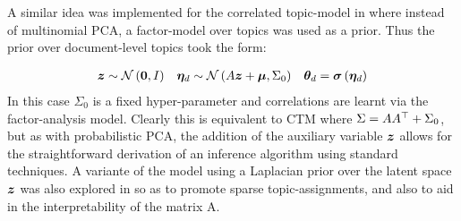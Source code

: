 A similar idea was implemented for the correlated topic-model in \cite{Putthividhya2009} where instead of multinomial PCA, a factor-model over topics was used as a prior. Thus the prior over document-level topics took the form:

\begin{align}
\bm z & \sim \mathcal{N} \left( {\bm 0}, {I} \right) & \bm \eta_d & \sim \mathcal{N} \left( {A\bm z + \bm \mu}, {\Sigma_0} \right) & { \bm \theta_d } = \bm \sigma\left(\bm \eta_d\right) 
\end{align}
In this case $\Sigma_0$ is a fixed hyper-parameter and correlations are learnt via the factor-analysis model. Clearly this is equivalent to CTM where $\Sigma = AA^\top + \Sigma_0$, but as with probabilistic PCA, the addition of the auxiliary variable $\bm z$ allows for the straightforward derivation of an inference algorithm using standard techniques. A variante of the model using a Laplacian prior over the latent space $\bm z$ was also explored in \cite{Putthividhya2009} so as to promote sparse topic-assignments, and also to aid in the interpretability of the matrix A.



